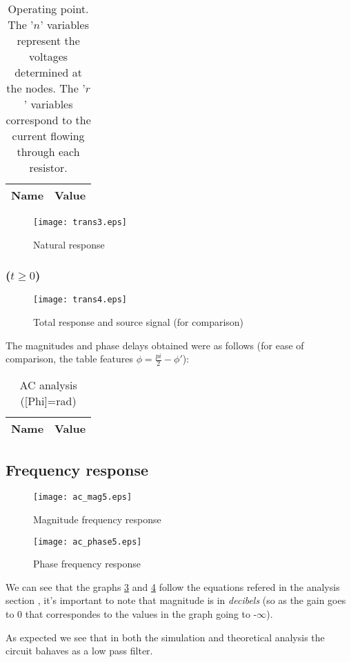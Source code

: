 \begin{table}[H]
	\centering
	\begin{tabular}{|l|c|}
		\hline    
		    {\bf Name} & {\bf Value} \\
                    \hline
                    \hline
		
	\end{tabular}
	\caption{Operating point. The '$n$' variables represent the voltages determined at the nodes. The '$r$' variables correspond to the current flowing through each resistor.}
	\label{tab:op2}
\end{table}

\begin{figure}[H]
  \centering
  \texttt{[image: trans3.eps]}
  \caption{Natural response}
  \label{fig:nat_sim}
\end{figure}

\subsubsection{($ t \geq 0$)}

\begin{figure}[H]
  \centering
  \texttt{[image: trans4.eps]}
  \caption{Total response and source signal (for comparison)}
  \label{fig:tot:sim}
\end{figure}

The magnitudes and phase delays obtained were as follows (for ease of comparison, the table features $\phi = \frac{pi}{2} - \phi'$):

\begin{table}[H]
	\centering
	\begin{tabular}{|l|c|}
		\hline    
		    {\bf Name} & {\bf Value} \\
                    \hline
                    \hline
		
	\end{tabular}
	\caption{AC analysis ([Phi]=rad)}
	\label{tab:op1}
\end{table}

\subsection{Frequency response}

\begin{figure}[H]
  \centering
  \texttt{[image: ac\_mag5.eps]}
  \caption{Magnitude frequency response}
  \label{freq_resp_mag_sim}
\end{figure}

\begin{figure}[H]
  \centering
  \texttt{[image: ac\_phase5.eps]}
  \caption{Phase frequency response}
  \label{freq_resp_pha_sim}
\end{figure}

We can see that the graphs \ref{freq_resp_mag_sim} and \ref{freq_resp_pha_sim} follow the equations refered in the analysis section , it's important to note that magnitude is in \emph{decibels} (so as the gain goes to 0 that correspondes to the values in the graph going to -$\infty$).

As expected we see that in both the simulation and theoretical analysis the circuit bahaves as a low pass filter.	
